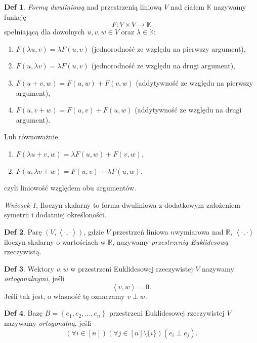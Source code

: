 \documentclass[a4paper, 12pt]{mwart}
\theoremstyle{definition}
\newtheorem{definicja}{Def}[section]
\theoremstyle{plain}
\theoremstyle{remark}
\newtheorem{wniosek}{Wniosek}[section]
\begin{document}
\begin{definicja}
	\emph{Formą dwuliniową} nad przestrzenią liniową $V$ nad ciałem $\mathbb{K}$ nazywamy funkcję
	\begin{equation}
		F:V \times V \to \mathbb{K}
	\end{equation}
	spełniającą dla dowolnych $u, v, w \in V$ oraz $\lambda \in \mathbb{K}$:
	\begin{enumerate}
		\item $F(\lambda u, v) = \lambda F(u, v)$ \quad (jednorodność ze względu na pierwszy argument),
		\item $F(u, \lambda v) = \lambda F(u, v)$ \quad (jednorodność ze względu na drugi argument),
		\item $F(u + v, w) = F(u, w) + F(v, w)$ \quad (addytywność ze względu na pierwszy argument),
		\item $F(u, v + w) = F(u, v) + F(u, w)$ \quad (addytywność ze względu na drugi argument).
	\end{enumerate}
	Lub równoważnie 
	\begin{enumerate}
		\item $F(\lambda u + v, w) = \lambda F(u, w) + F(v, w)$,
		\item $F(u, \lambda v + w) = F(u, v) +  \lambda F(u, w)$.
	\end{enumerate}
	czyli liniowość względem obu argumentów.
\end{definicja}
\begin{wniosek}
	Iloczyn skalarny to forma dwuliniowa z dodatkowym założeniem symetrii i dodatniej określoności. %
\end{wniosek}
\begin{definicja}
	Parę $\left(V, \left< \cdot, \cdot \right> \right)$, gdzie $V$ \ppauza przestrzeń liniowa $n$\dywiz wymiarowa nad $\mathbb{R}$, $\left< \cdot, \cdot \right>$ \ppauza iloczyn skalarny o wartościach w $\mathbb{R}$, nazywamy
	\emph{przestrzenią Euklidesową} rzeczywistą.
\end{definicja}
\begin{definicja}
	Wektory $v, w$ w przestrzeni Euklidesowej rzeczywistej $V$ nazywamy \emph{ortogonalnymi}, jeśli
	\begin{equation}
		\left< v, w \right> = 0.
	\end{equation}
	Jeśli tak jest, o własność tę oznaczamy $v \perp w$.
\end{definicja}
\begin{definicja}
	Bazę $B = \left\{e_1, e_2, \ldots, e_n\right\}$ przestrzeni Euklidesowej rzeczywistej $V$ nazywamy \emph{ortogonalną}, jeśli
	\begin{equation}
		\left(\forall i \in [n]\right)\left(\forall j \in [n] \setminus \{i\}\right)\left(e_i \perp e_j\right).
	\end{equation}
\end{definicja}
\end{document}
